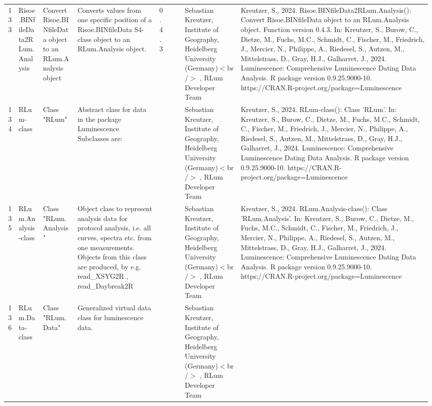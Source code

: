 \begin{table}[ht]
\begin{tabular}{rllllllll}
 \\ 
  133 & Risoe.BINfileData2RLum.Analysis & Convert Risoe.BINfileData object to an RLum.Analysis object & Converts values from one specific position of a Risoe.BINfileData S4-class object to an RLum.Analysis object. & 0.4.3
 &  &  & Sebastian Kreutzer, Institute of Geography, Heidelberg University (Germany)$<$br /$>$ , RLum Developer Team & Kreutzer, S., 2024. Risoe.BINfileData2RLum.Analysis(): Convert Risoe.BINfileData object to an RLum.Analysis object. Function version 0.4.3. In: Kreutzer, S., Burow, C., Dietze, M., Fuchs, M.C., Schmidt, C., Fischer, M., Friedrich, J., Mercier, N., Philippe, A., Riedesel, S., Autzen, M., Mittelstrass, D., Gray, H.J., Galharret, J., 2024. Luminescence: Comprehensive Luminescence Dating Data Analysis. R package version 0.9.25.9000-10. https://CRAN.R-project.org/package=Luminescence
 \\ 
  134 & RLum-class & Class  "RLum" & Abstract class for data in the package Luminescence Subclasses are: &  &  &  & Sebastian Kreutzer, Institute of Geography, Heidelberg University (Germany)$<$br /$>$ , RLum Developer Team & Kreutzer, S., 2024. RLum-class(): Class 'RLum'. In: Kreutzer, S., Burow, C., Dietze, M., Fuchs, M.C., Schmidt, C., Fischer, M., Friedrich, J., Mercier, N., Philippe, A., Riedesel, S., Autzen, M., Mittelstrass, D., Gray, H.J., Galharret, J., 2024. Luminescence: Comprehensive Luminescence Dating Data Analysis. R package version 0.9.25.9000-10. https://CRAN.R-project.org/package=Luminescence
 \\ 
  135 & RLum.Analysis-class & Class  "RLum.Analysis" & Object class to represent analysis data for protocol analysis, i.e. all curves, spectra etc. from one measurements. Objects from this class are produced, by e.g.  read\_XSYG2R ,  read\_Daybreak2R &  &  &  & Sebastian Kreutzer, Institute of Geography, Heidelberg University (Germany)$<$br /$>$ , RLum Developer Team & Kreutzer, S., 2024. RLum.Analysis-class(): Class 'RLum.Analysis'. In: Kreutzer, S., Burow, C., Dietze, M., Fuchs, M.C., Schmidt, C., Fischer, M., Friedrich, J., Mercier, N., Philippe, A., Riedesel, S., Autzen, M., Mittelstrass, D., Gray, H.J., Galharret, J., 2024. Luminescence: Comprehensive Luminescence Dating Data Analysis. R package version 0.9.25.9000-10. https://CRAN.R-project.org/package=Luminescence
 \\ 
  136 & RLum.Data-class & Class  "RLum.Data" & Generalized virtual data class for luminescence data. &  &  &  & Sebastian Kreutzer, Institute of Geography, Heidelberg University (Germany)$<$br /$>$ , RLum Developer Team &  \\ 

\end{tabular}
\end{table}
